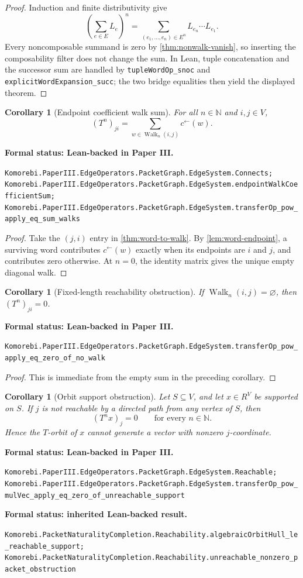 \documentclass[11pt]{article}
\newtheorem{corollary}[theorem]{Corollary}
\theoremstyle{definition}
\theoremstyle{remark}
\newcommand{\N}{\mathbb N}
\newcommand{\Walk}{\operatorname{Walk}}
\newcommand{\leanname}[1]{\nolinkurl{#1}}
\newcommand{\statusleanthree}[1]{%
  \par\smallskip\noindent
  {\color{leanblue}\textbf{Formal status: Lean-backed in Paper III.}}\par
  \begingroup\small\raggedright\leanname{#1}\par\endgroup\smallskip}
\newcommand{\statusleanprior}[1]{%
  \par\smallskip\noindent
  {\color{leanblue}\textbf{Formal status: inherited Lean-backed result.}}\par
  \begingroup\small\raggedright\leanname{#1}\par\endgroup\smallskip}
\begin{document}
\begin{proof}
Induction and finite distributivity give
\[
\left(\sum_{e\in E}L_e\right)^n
=
\sum_{(e_1,\ldots,e_n)\in E^n}L_{e_n}\cdots L_{e_1}.
\]
Every noncomposable summand is zero by
\cref{thm:nonwalk-vanish}, so inserting the composability filter does not
change the sum.  In Lean, tuple concatenation and the successor sum are
handled by \leanname{tupleWordOp_snoc} and
\leanname{explicitWordExpansion_succ}; the two bridge equalities then yield
the displayed theorem.
\end{proof}

\begin{corollary}[Endpoint coefficient walk sum]
\label{cor:word-to-walk-entry}
For all $n\in\N$ and $i,j\in V$,
\[
  \boxed{
  (T^n)_{ji}
  =
  \sum_{w\in\Walk_n(i,j)}c^\leftarrow(w).
  }
\]
\end{corollary}
\statusleanthree{Komorebi.PaperIII.EdgeOperators.PacketGraph.EdgeSystem.Connects; Komorebi.PaperIII.EdgeOperators.PacketGraph.EdgeSystem.endpointWalkCoefficientSum; Komorebi.PaperIII.EdgeOperators.PacketGraph.EdgeSystem.transferOp_pow_apply_eq_sum_walks}

\begin{proof}
Take the $(j,i)$ entry in \cref{thm:word-to-walk}.  By
\cref{lem:word-endpoint}, a surviving word contributes
$c^\leftarrow(w)$ exactly when its endpoints are $i$ and $j$, and contributes
zero otherwise.  At $n=0$, the identity matrix gives the unique empty
diagonal walk.
\end{proof}

\begin{corollary}[Fixed-length reachability obstruction]
\label{cor:fixed-reachability}
If $\Walk_n(i,j)=\varnothing$, then $(T^n)_{ji}=0$.
\end{corollary}
\statusleanthree{Komorebi.PaperIII.EdgeOperators.PacketGraph.EdgeSystem.transferOp_pow_apply_eq_zero_of_no_walk}

\begin{proof}
This is immediate from the empty sum in the preceding corollary.
\end{proof}

\begin{corollary}[Orbit support obstruction]
\label{cor:orbit-reachability}
Let $S\subseteq V$, and let $x\in R^V$ be supported on $S$.  If $j$ is not
reachable by a directed path from any vertex of $S$, then
\[
  (T^nx)_j=0\qquad\text{for every }n\in\N.
\]
Hence the $T$-orbit of $x$ cannot generate a vector with nonzero
$j$-coordinate.
\end{corollary}
\statusleanthree{Komorebi.PaperIII.EdgeOperators.PacketGraph.EdgeSystem.Reachable; Komorebi.PaperIII.EdgeOperators.PacketGraph.EdgeSystem.transferOp_pow_mulVec_apply_eq_zero_of_unreachable_support}
\statusleanprior{Komorebi.PacketNaturalityCompletion.Reachability.algebraicOrbitHull_le_reachable_support; Komorebi.PacketNaturalityCompletion.Reachability.unreachable_nonzero_packet_obstruction}
\end{document}
